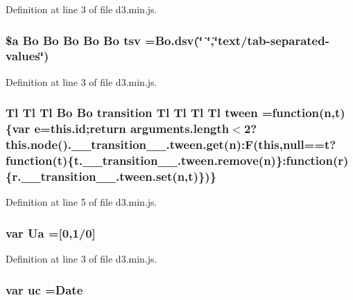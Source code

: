 Definition at line 3 of file d3.\+min.\+js.

\subsubsection[{tsv}]{\setlength{\rightskip}{0pt plus 5cm}\${\bf a} {\bf Bo} {\bf Bo} {\bf Bo} {\bf Bo} {\bf Bo} tsv ={\bf Bo.\+dsv}(\char`\"{} \char`\"{},\char`\"{}text/tab-\/separated-\/{\bf values}\char`\"{})}\label{d3_8min_8js_aa86ceac8a8ac2662b0844cbf5b4df798}


Definition at line 3 of file d3.\+min.\+js.

\subsubsection[{tween}]{ {\bf Tl} {\bf Tl} {\bf Tl} {\bf Bo} {\bf Bo} {\bf transition} {\bf Tl} {\bf Tl} {\bf Tl} {\bf Tl} tween =function({\bf n},t)\{var {\bf e}=this.\+id;{\bf return} arguments.\+length$<$2?{\bf this.\+node}().\+\_\+\+\_\+transition\+\_\+\+\_\+[{\bf e}].tween.\+get({\bf n})\+:F({\bf this},null==t?function(t)\{t.\+\_\+\+\_\+transition\+\_\+\+\_\+[{\bf e}].{\bf tween.\+remove}({\bf n})\}\+:function({\bf r})\{r.\+\_\+\+\_\+transition\+\_\+\+\_\+[{\bf e}].{\bf tween.\+set}({\bf n},t)\})\}}\label{d3_8min_8js_ac6cd9eec3574b407a7324ad866f57b5e}


Definition at line 5 of file d3.\+min.\+js.

\subsubsection[{Ua}]{\setlength{\rightskip}{0pt plus 5cm}var Ua =[0,1/0]}\label{d3_8min_8js_a53bae0591db38cccf32020e0ab2f60dd}


Definition at line 3 of file d3.\+min.\+js.

\subsubsection[{uc}]{\setlength{\rightskip}{0pt plus 5cm}var uc =Date}\label{d3_8min_8js_a4c0df009766b298ffc99ba615b1b10bb}


